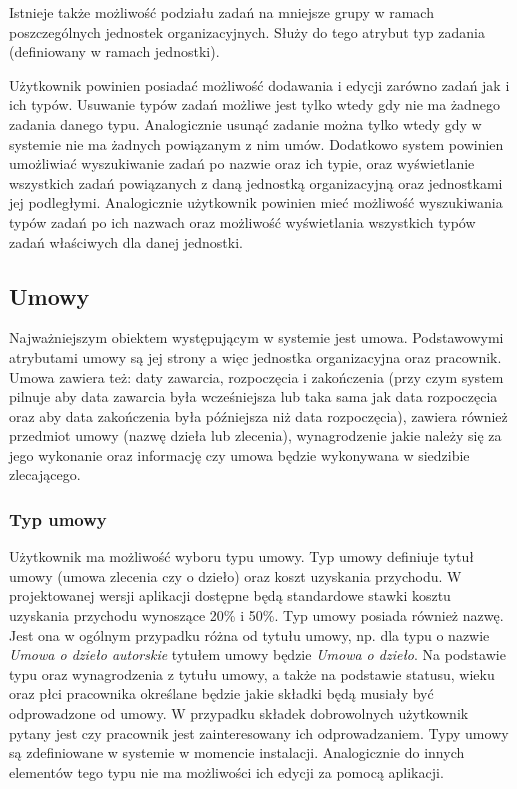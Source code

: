 Istnieje także możliwość podziału zadań na mniejsze grupy w ramach poszczególnych jednostek organizacyjnych. Służy do tego atrybut typ zadania (definiowany w ramach jednostki).

Użytkownik powinien posiadać możliwość dodawania i edycji zarówno zadań jak i ich typów. Usuwanie typów zadań możliwe jest tylko wtedy gdy nie ma żadnego zadania danego typu. Analogicznie usunąć zadanie można tylko wtedy gdy w systemie nie ma żadnych powiązanym z nim umów. Dodatkowo system powinien umożliwiać wyszukiwanie zadań po nazwie oraz ich typie, oraz wyświetlanie wszystkich zadań powiązanych z daną jednostką organizacyjną oraz jednostkami jej podległymi. Analogicznie użytkownik powinien mieć możliwość wyszukiwania typów zadań po ich nazwach oraz możliwość wyświetlania wszystkich typów zadań właściwych dla danej jednostki.

\subsection[Umowy][Umowy]{Umowy}
Najważniejszym obiektem występującym w systemie jest umowa. Podstawowymi atrybutami umowy są jej strony a więc jednostka organizacyjna oraz pracownik. Umowa zawiera też: daty zawarcia, rozpoczęcia i zakończenia (przy czym system pilnuje aby data zawarcia była wcześniejsza lub taka sama jak data rozpoczęcia oraz aby data zakończenia była późniejsza niż data rozpoczęcia), zawiera również przedmiot umowy (nazwę dzieła lub zlecenia), wynagrodzenie jakie należy się za jego wykonanie oraz informację czy umowa będzie wykonywana w siedzibie zlecającego. 

\subsubsection{Typ umowy}
Użytkownik ma możliwość wyboru typu umowy. Typ umowy definiuje tytuł umowy (umowa zlecenia czy o dzieło) oraz koszt uzyskania przychodu. W projektowanej wersji aplikacji dostępne będą standardowe stawki kosztu uzyskania przychodu wynoszące 20\% i 50\%. Typ umowy posiada również nazwę. Jest ona w ogólnym przypadku różna od tytułu umowy, np. dla typu o nazwie \textit{Umowa o dzieło autorskie} tytułem umowy będzie \textit{Umowa o dzieło}. Na podstawie typu oraz wynagrodzenia z tytułu umowy, a także na podstawie statusu, wieku oraz płci pracownika określane będzie jakie składki będą musiały być odprowadzone od umowy. W przypadku składek dobrowolnych użytkownik pytany jest czy pracownik jest zainteresowany ich odprowadzaniem. Typy umowy są zdefiniowane w systemie w momencie instalacji. Analogicznie do innych elementów tego typu nie ma możliwości ich edycji za pomocą aplikacji.

